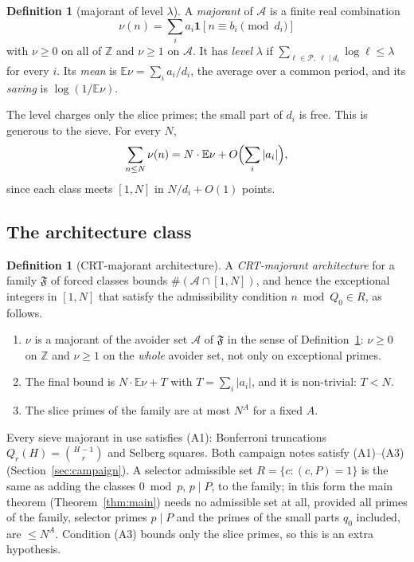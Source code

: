 \documentclass[10pt,reqno]{amsart}
\theoremstyle{definition}
\newtheorem{definition}[theorem]{Definition}
\theoremstyle{remark}
\newcommand{\A}{\mathcal A}
\newcommand{\cP}{\mathcal P}
\newcommand{\cF}{\mathfrak F}
\newcommand{\E}{\mathbb E}
\newcommand{\Z}{\mathbb Z}
\newcommand{\ind}{\mathbf 1}
\begin{document}
\begin{definition}[majorant of level $\lambda$]\label{def:majorant}
A \emph{majorant} of $\A$ is a finite real combination
\[
 \nu(n)=\sum_ia_i\ind[n\equiv b_i\pmod{d_i}]
\]
with $\nu\geq0$ on all of $\Z$ and $\nu\geq1$ on $\A$.  It has
\emph{level} $\lambda$ if $\sum_{\ell\in\cP,\ \ell\mid d_i}\log\ell\leq\lambda$
for every $i$.  Its \emph{mean} is $\E\nu=\sum_ia_i/d_i$, the average
over a common period, and its \emph{saving} is $\log(1/\E\nu)$.
\end{definition}
The level charges only the slice primes; the small part of $d_i$ is free.
This is generous to the sieve.  For every $N$,
\begin{equation}\label{eq:transfer}
 \sum_{n\leq N}\nu(n)=N\cdot\E\nu+O\Bigl(\sum_i|a_i|\Bigr),
\end{equation}
since each class meets $[1,N]$ in $N/d_i+O(1)$ points.

\subsection{The architecture class}
\begin{definition}[CRT-majorant architecture]\label{def:arch}
A \emph{CRT-majorant architecture} for a family $\cF$ of forced classes
bounds $\#(\A\cap[1,N])$, and hence the exceptional integers in
$[1,N]$ that satisfy the admissibility condition $n\bmod Q_0\in R$, as follows.
\begin{enumerate}
\item[(A1)] $\nu$ is a majorant of the avoider set $\A$ of $\cF$ in the
  sense of Definition~\ref{def:majorant}: $\nu\geq0$ on $\Z$ and $\nu\geq1$
  on the \emph{whole} avoider set, not only on exceptional primes.
\item[(A2)] The final bound is $N\cdot\E\nu+T$ with
  $T=\sum_i|a_i|$, and it is non-trivial: $T<N$.
\item[(A3)] The slice primes of the family are at most $N^{A}$ for a fixed
  $A$.
\end{enumerate}
\end{definition}
Every sieve majorant in use satisfies (A1): Bonferroni truncations
$Q_r(H)=\binom{H-1}r$ and Selberg squares.  Both campaign notes satisfy
(A1)--(A3) (Section~\ref{sec:campaign}).  A selector admissible set
$R=\{c:(c,P)=1\}$ is the same as adding the classes $0\bmod p$, $p\mid P$, to
the family; in this form the main theorem (Theorem~\ref{thm:main}) needs
no admissible set at all, provided all primes of the family, selector
primes $p\mid P$ and the primes of the small parts $q_0$ included, are
$\leq N^A$.  Condition (A3) bounds only the slice primes, so this is an
extra hypothesis.
\end{document}

